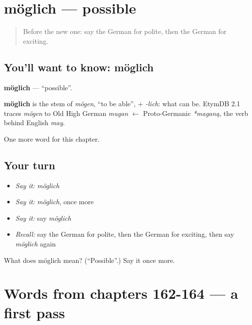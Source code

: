 \section[möglich]{möglich — possible}

\label{lesson:GE-C167-moeglich}



\begin{quote}
Before the new one: say the German for polite, then the German for exciting.
\end{quote}

\subsection*{You'll want to know: möglich}
\textbf{möglich} — \textquotedblleft{}possible\textquotedblright{}.

\begin{cousinweb}
\textbf{möglich} is the stem of \emph{mögen}, \textquotedblleft{}to be able\textquotedblright{}, + \emph{-lich}: what can be. EtymDB 2.1 traces \emph{mögen} to Old High German \emph{mugan} $\leftarrow$ Proto-Germanic \emph{*maganą}, the verb behind English \emph{may}.
\end{cousinweb}

\begin{grammarlens}[title={What you've built}]
One more word for this chapter.
\end{grammarlens}

\subsection*{Your turn}
\begin{itemize}
\raggedright
  \item \emph{Say it:} \emph{möglich}
  \item \emph{Say it:} \emph{möglich}, once more
  \item \emph{Say it:} say \emph{möglich}
  \item \emph{Recall:} say the German for polite, then the German for exciting, then say \emph{möglich} again
\end{itemize}

\begin{tcolorbox}[breakable,colback=teal!4,colframe=teal!35!black,title={Before you move on}]
What does möglich mean? (\textquotedblleft{}Possible\textquotedblright{}.) Say it once more.
\end{tcolorbox}
\section[(dialogue)]{Words from chapters 162-164 — a first pass}

